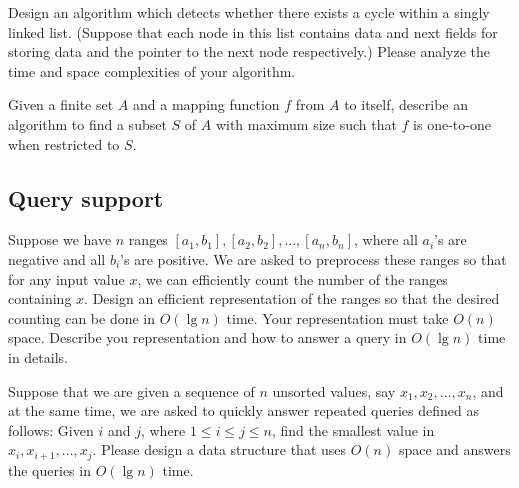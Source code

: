 \begin{Exercise}
Design an algorithm which detects whether there exists a cycle within a singly linked list. (Suppose that each node in this list contains data and next fields for storing data and the pointer to the next node respectively.) Please analyze the time and space complexities of your algorithm. 
\end{Exercise}
\begin{Answer}
\end{Answer}

\begin{Exercise}
Given a finite set $A$ and a mapping function $f$ from $A$ to itself, describe an algorithm to find a subset $S$ of $A$ with maximum size such that $f$ is one-to-one when restricted to $S$.
\end{Exercise}
\begin{Answer}
\end{Answer}

\subsection{Query support}

\begin{Exercise}
Suppose we have $n$ ranges $[a_1, b_1], [a_2, b_2], \dots, [a_n, b_n]$, where all $a_i$'s are negative and all $b_i$'s are positive. We are asked to preprocess these ranges so that for any input value $x$, we can efficiently count the number of the ranges containing $x$. Design an efficient representation of the ranges so that the desired counting can be done in $O(\lg n)$ time. Your representation must take $O(n)$ space. Describe you representation and how to answer a query in $O(\lg n)$ time in details. 
\end{Exercise}
\begin{Answer}
\end{Answer}

\begin{Exercise}
Suppose that we are given a sequence of $n$ unsorted values, say $x_1, x_2, \dots, x_n$, and at the same time, we are asked to quickly answer repeated queries defined as follows: Given $i$ and $j$, where $1 \leq i \leq j \leq n$, find the smallest value in $x_i, x_{i+1}, \dots, x_j$. Please design a data structure that uses $O(n)$ space and answers the queries in $O(\lg n)$ time. 
\end{Exercise}
\begin{Answer}
\end{Answer}


\printbibliography[heading=subbibliography]
